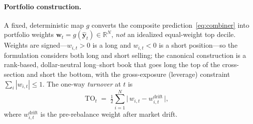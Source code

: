 \documentclass[11pt]{article}
\newcommand{\R}{\mathbb{R}}
\newcommand{\wt}{\mathbf{w}}
\newcommand{\pred}{\hat{\bm{y}}}
\begin{document}
\paragraph{Portfolio construction.}
A fixed, deterministic map $g$ converts the composite
prediction~\eqref{eq:combiner} into portfolio weights
$\wt_t = g(\pred_t)\in\R^{N}$, \emph{not} an idealized equal-weight top decile. Weights
are signed---$w_{i,t}>0$ is a long and $w_{i,t}<0$ is a short position---so the
formulation considers both long and short selling; the canonical construction is a
rank-based, dollar-neutral long--short book that goes long the top of the cross-section
and short the bottom, with the gross-exposure (leverage) constraint
$\sum_i |w_{i,t}|\le 1$. The one-way \emph{turnover} at $t$ is
\begin{equation}
  \mathrm{TO}_t \;=\; \tfrac{1}{2}\textstyle\sum_{i=1}^{N}
  \big|\,w_{i,t}-w^{\mathrm{drift}}_{i,t}\,\big|,
  \label{eq:turnover}
\end{equation}
where $w^{\mathrm{drift}}_{i,t}$ is the pre-rebalance weight after market drift.
\end{document}
